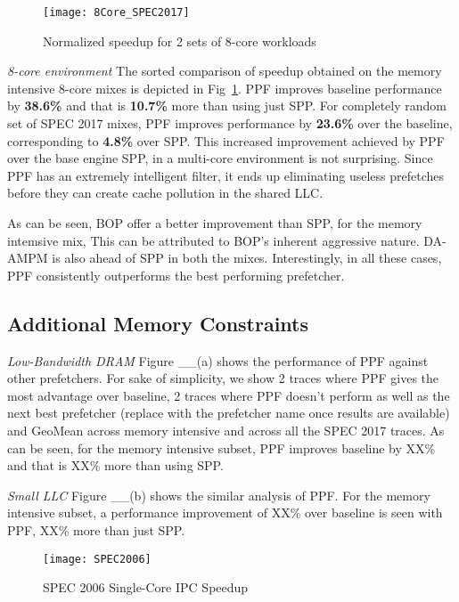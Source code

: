\begin{figure}[h]
\texttt{[image: 8Core\_SPEC2017]}
\caption{Normalized speedup for 2 sets of 8-core workloads}
\label{Fig:8Core_SPEC2017}
\end{figure}


\textit{8-core environment} The sorted comparison of speedup obtained 
on the memory intensive 8-core mixes is depicted in Fig~\ref{Fig:8Core_SPEC2017}.
PPF improves baseline performance by \textbf{38.6\%} and that is \textbf{10.7\%} 
more than using just SPP. 
For completely random set of SPEC 2017 mixes, PPF improves performance by 
\textbf{23.6\%} over the baseline, corresponding to \textbf{4.8\%} over SPP.
This increased improvement achieved by PPF over the base engine SPP,
in a multi-core environment is not surprising. 
Since PPF has an extremely intelligent filter, it ends up 
eliminating useless prefetches before they can create cache
pollution in the shared LLC. 

As can be seen, BOP offer a better improvement than 
SPP, for the memory intemsive mix, This can be attributed 
to BOP's inherent aggressive nature. DA-AMPM is also ahead of
SPP in both the mixes. Interestingly, in all these cases, 
PPF consistently outperforms the best performing prefetcher.



\subsection{Additional Memory Constraints}
\label{Results-AdditionalMem}

\textit{Low-Bandwidth DRAM}
Figure \_\_(a) shows the performance of PPF against other prefetchers. 
For sake of simplicity, we show 2 traces where PPF gives the most advantage
over baseline, 2 traces where PPF doesn't perform as well as the next
best prefetcher (replace with the prefetcher name once results are
available) and GeoMean across memory intensive and across all the 
SPEC 2017 traces. As can be seen, for the memory intensive subset,
 PPF improves baseline by XX\% and that is XX\% more than using SPP.

\textit{Small LLC}
Figure \_\_(b) shows the similar analysis of PPF.
For the memory intensive subset, a performance improvement of XX\% 
over baseline is seen with PPF, XX\% more than just SPP.


\begin{figure}[ht]
\texttt{[image: SPEC2006]}
\caption{SPEC 2006 Single-Core IPC Speedup}
\label{Fig:SPEC2006_1core}
\end{figure}


